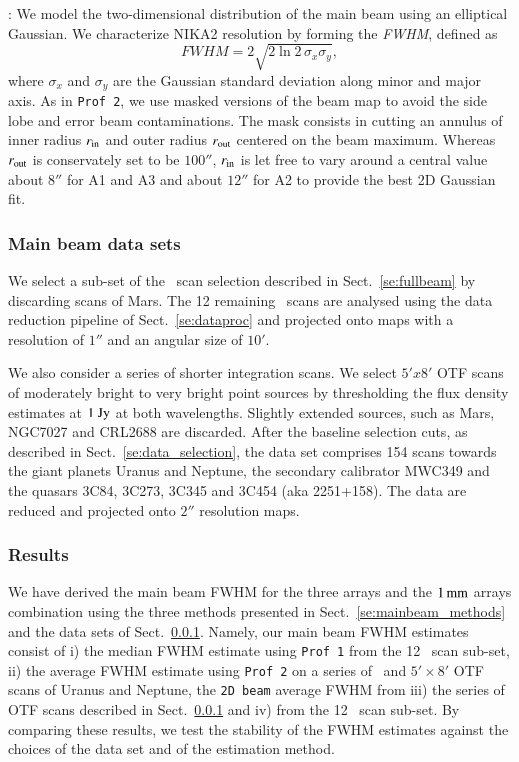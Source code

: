 : We model the two-dimensional distribution of the main
beam using an elliptical Gaussian. We characterize NIKA2 resolution
by forming the \emph{FWHM}, defined as
\begin{equation}
  FWHM = 2 \sqrt{2\ln {2}\, \sigma_x\sigma_y},
\end{equation}
where $\sigma_x$ and $\sigma_y$ are the Gaussian standard deviation
along minor and major axis.
As in {\tt Prof 2}, we use masked versions of the
beam map to avoid the side lobe and error beam contaminations.
The mask consists in cutting an annulus of inner radius
$r_{\rm{in}}$ and outer radius $r_{\rm{out}}$ centered on the beam
maximum. Whereas $r_{\rm{out}}$ is conservately set to be $100''$,
$r_{\rm{in}}$ is let free to vary around a central value about $8''$
for A1 and A3 and about $12''$ for A2 to provide the best 2D Gaussian
fit.

\subsubsection{Main beam data sets}
\label{se:mainbeam_dataset}

We select a sub-set of the \bm\ scan selection described in
Sect.~\ref{se:fullbeam} by discarding scans of Mars.
The 12 remaining \bm\ scans are analysed using the data reduction
pipeline of Sect.~\ref{se:dataproc} and projected onto maps
with a resolution of $1''$ and an angular size of $10'$.

We also consider a series of shorter integration scans. We select $5'x8'$ OTF
scans of moderately bright to very bright point sources by
thresholding the flux density estimates at $1~\rm{Jy}$ at both
wavelengths. Slightly extended sources, such as Mars, NGC7027 and
CRL2688 are discarded. After the baseline selection cuts, as described in
Sect.~\ref{se:data_selection}, the data set comprises 154 %
scans
towards the giant planets Uranus and Neptune, the secondary calibrator
MWC349 and the quasars 3C84, 3C273, 3C345 and 3C454 (aka
2251+158). The data are reduced and projected onto $2''$ resolution
maps. 

\subsubsection{Results}
\label{se:mainbeam_results}

We have derived the main beam FWHM for the three arrays and the
$1\,\rm{mm}$ arrays combination using the three methods presented in
Sect.~\ref{se:mainbeam_methods} and the data
sets of Sect.~\ref{se:mainbeam_dataset}. Namely, our main beam FWHM estimates
consist of i) the median FWHM estimate using {\tt Prof 1} from the 12 \bm\ scan
sub-set, ii) the average FWHM estimate using {\tt Prof 2} on a series
of \bm\ and $5' \times 8'$ OTF scans of Uranus and Neptune, the {\tt 2D beam} average FWHM
from iii) the series of OTF scans described in
Sect.~\ref{se:mainbeam_dataset} and iv) from the 12 \bm\ scan
sub-set. By comparing these results, we test the stability of the FWHM
estimates against the choices of the data set and of the estimation
method. %

